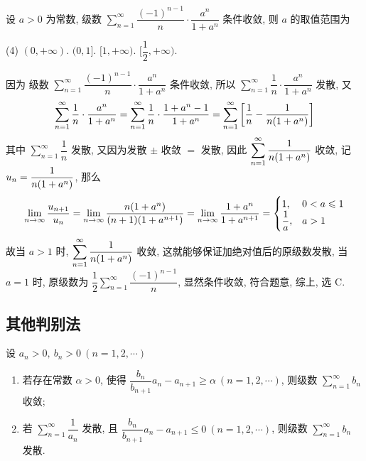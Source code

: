 \begin{example}
    设 $a>0$ 为常数, 级数 $ \displaystyle \sum_{n=1}^{\infty} \dfrac{(-1)^{n-1}}{n}\cdot \dfrac{a^n}{1+a^n} $ 条件收敛, 则 $a$ 的取值范围为 
    \begin{tasks}(4)
        \task $(0,+\infty)$.
        \task $(0,1]$.
        \task $[1,+\infty)$.
        \task $[\dfrac{1}{2},+\infty)$.
    \end{tasks}
\end{example}
\begin{solution}
    因为 级数 $ \displaystyle \sum_{n=1}^{\infty} \dfrac{(-1)^{n-1}}{n}\cdot \dfrac{a^n}{1+a^n} $ 条件收敛, 所以 $\displaystyle \sum_{n=1}^{\infty} \dfrac{1}{n}\cdot\dfrac{a^n}{1+a^n}$ 发散, 
    又 $$
    \sum_{n=1}^{\infty} \dfrac{1}{n}\cdot\dfrac{a^n}{1+a^n}=\sum_{n=1}^{\infty} \dfrac{1}{n}\cdot\dfrac{1+a^n-1}{1+a^n}=\sum_{n=1}^{\infty} \qty[\dfrac{1}{n}-\dfrac{1}{n\qty(1+a^n)}]
    $$
    其中 $\displaystyle \sum_{n=1}^{\infty} \dfrac{1}{n}$ 发散, 又因为发散 $\pm$ 收敛 $=$ 发散, 因此 $ \displaystyle \sum_{n=1}^{\infty} \dfrac{1}{n\qty(1+a^n)} $ 收敛, 
    记 $u_n=\dfrac{1}{n\qty(1+a^n)}$, 那么 $$
    \lim_{n \to \infty}\dfrac{u_{n+1}}{u_n}=\lim_{n \to \infty}\dfrac{n\qty(1+a^n)}{(n+1)\qty(1+a^{n+1})}=\lim_{n \to \infty}\dfrac{1+a^n}{1+a^{n+1}}=\begin{cases}
        1,&0<a\leqslant 1\\ \dfrac{1}{a},&a>1
    \end{cases}
    $$
    故当 $a>1$ 时, $ \displaystyle \sum_{n=1}^{\infty} \dfrac{1}{n\qty(1+a^n)} $ 收敛, 这就能够保证加绝对值后的原级数发散, 当 $a=1$ 时, 原级数为 $ \displaystyle \dfrac{1}{2}\sum_{n=1}^{\infty} \dfrac{(-1)^{n-1}}{n} $, 显然条件收敛, 符合题意, 综上, 选 C.
\end{solution}

\subsection{其他判别法}

\begin{theorem}
    设 $a_n>0,~b_n>0~(n=1,2, \cdots )$\begin{enumerate}[label=(\arabic{*})]
        \item 若存在常数 $\alpha>0$, 使得 $\dfrac{b_n}{b_{n+1}}a_n-a_{n+1}\geqslant \alpha~(n=1,2, \cdots )$, 则级数 $\displaystyle \sum_{n=1}^{\infty}b_n$ 收敛;
        \item 若 $\displaystyle \sum_{n=1}^{\infty}\dfrac{1}{a_n}$ 发散, 且 $\dfrac{b_n}{b_{n+1}}a_n-a_{n+1}\leqslant 0~(n=1,2, \cdots )$, 则级数 $\displaystyle \sum_{n=1}^{\infty}b_n$ 发散.
    \end{enumerate}
\end{theorem}


